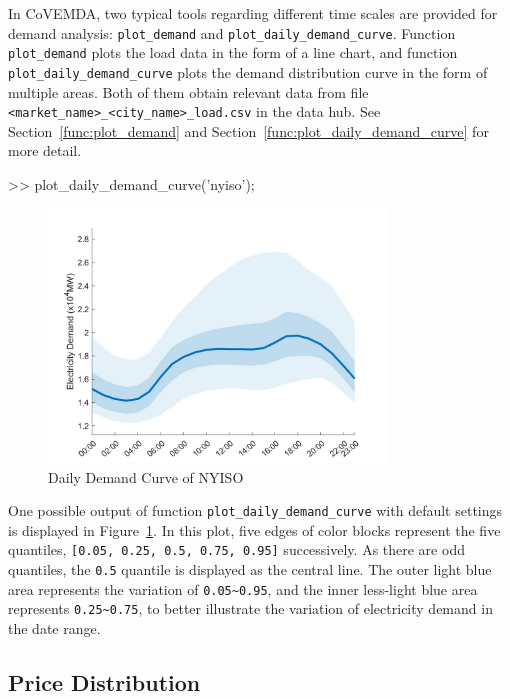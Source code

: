 \documentclass[10pt]{article}
\newcommand{\covemda}{CoVEMDA}
\numberwithin{equation}{section}
\numberwithin{table}{section}
\numberwithin{figure}{section}
\begin{document}
In \covemda{}, two typical tools regarding different time scales are provided for demand analysis: \verb!plot_demand! and \verb!plot_daily_demand_curve!. Function \verb!plot_demand! plots the load data in the form of a line chart, and function \verb!plot_daily_demand_curve! plots the demand distribution curve in the form of multiple areas. Both of them obtain relevant data from file \verb!<market_name>_<city_name>_load.csv! in the data hub. See Section~\ref{func:plot_demand} and Section~\ref{func:plot_daily_demand_curve} for more detail.

\begin{Command}
>> plot_daily_demand_curve('nyiso');
\end{Command}

\begin{figure}
  \centering
  \noindent\includegraphics[width=0.8\textwidth]{figures/visualization_plot_daily_demand_curve.jpg}
  \caption{Daily Demand Curve of NYISO} \label{fig:vis_1}
\end{figure}

One possible output of function \verb!plot_daily_demand_curve! with default settings is displayed in Figure~\ref{fig:vis_1}. In this plot, five edges of color blocks represent the five quantiles, \verb![0.05, 0.25, 0.5, 0.75, 0.95]! successively. As there are odd quantiles, the \verb!0.5! quantile is displayed as the central line. The outer light blue area represents the variation of \verb!0.05~0.95!, and the inner less-light blue area represents \verb!0.25~0.75!, to better illustrate the variation of electricity demand in the date range.



\subsection{Price Distribution}
\end{document}
